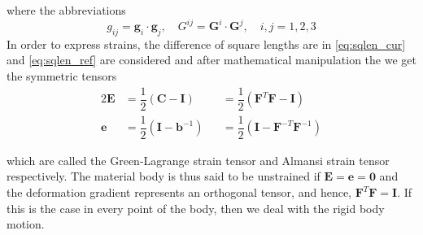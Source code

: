 where the abbreviations 
\begin{equation}
    g_{ij} = \bm{g}_{i} \cdot \bm{g}_{j}, \quad
    G^{ij} = \bm{G}^{i} \cdot \bm{G}^{j}, \quad
    i,j = 1,2,3
\end{equation}
In order to express strains, the difference of square lengths are in \cref{eq:sqlen_cur} and \cref{eq:sqlen_ref} are considered and after mathematical manipulation the we get the symmetric tensors
\begin{alignat}{2}
    \mathbf{E} 
    &=\dfrac{1}{2} (\mathbf{C} - \mathbf{I}) 
    &&=\dfrac{1}{2} (\mathbf{F}^{T}\mathbf{F} - \mathbf{I})\\
    \mathbf{e}
    &=\dfrac{1}{2} (\mathbf{I} - \mathbf{b}^{-1}) 
    &&=\dfrac{1}{2} (\mathbf{I} - \mathbf{F}^{-T} \mathbf{F}^{-1})
\end{alignat}

which are called the Green-Lagrange strain tensor and Almansi strain tensor respectively. The material body is thus said to be unstrained if \(\mathbf{E} = \mathbf{e} = \mathbf{0}\) and the deformation gradient represents an orthogonal tensor, and hence, \(\mathbf{F}^{T}\mathbf{F} = \mathbf{I}\). If this is the case in every point of the body, then we deal with the rigid body motion.

